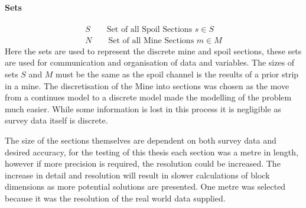 \paragraph*{Sets}
\begin{align}
\label{MIP:Set:S}
S\qquad \text{Set of all Spoil Sections   } s\in S\\
\label{MIP:Set:N}
N\qquad \text{Set  of all Mine Sections } m \in M
\end{align}
Here the sets are used to represent the discrete mine and spoil sections, these sets are used for communication and organisation  of data and variables. The sizes of sets $S$ and $M$ must be the same as the spoil channel is the results of a prior strip in a mine. The discretisation of the Mine into sections was chosen as the move from a continues model to a discrete model made the modelling of the problem much easier. While some information is lost in this process it is negligible as survey data itself is discrete.

 The size of the sections themselves are dependent on both survey data and desired accuracy, for the testing of this thesis each section was a metre in length, however if more precision is required,  the resolution could be increased. The increase in detail and resolution will result in slower calculations of block dimensions as more potential solutions are presented. One metre was selected because it was the resolution of the real world data supplied.
